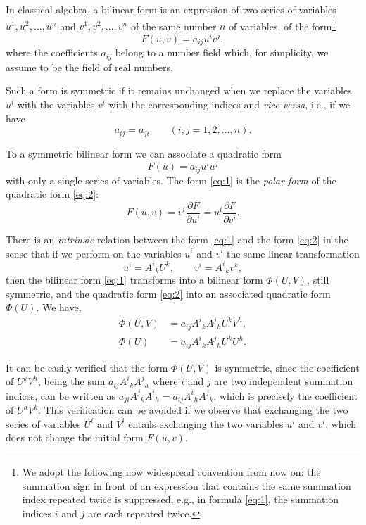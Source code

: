 \documentclass[leqno,11pt]{book}
\numberwithin{equation}{chapter}
\newcommand{\pd}{\partial}
\theoremstyle{shape1}
\theoremstyle{shape0}
\theoremstyle{shape2}
\theoremstyle{definition}
\begin{document}
\fsec In classical algebra,  a bilinear form  is an expression of two series of variables $u^{1}, u^{2}, \dots, u^{n}$ and $v^{1}, v^{2}, \dots, v^{n}$ of the same number $n$ of variables, of the form\footnote{We adopt the following now widespread convention from now on:  the summation sign in front of an expression that contains the same summation index repeated twice is suppressed, {e.g.}, in formula \eqref{eq:1},  the summation indices $i$ and $j$ are each repeated twice.}
\begin{equation}
  \label{eq:1}  
F(u,v)=a_{ij}u^{i}v^{j},
\end{equation}
where the coefficients $a_{ij}$ belong to a number field which, for simplicity, we assume to be the field of real numbers.

Such a form is  symmetric  if it remains unchanged when we replace the variables $u^{i}$ with the variables $v^{i}$ with the corresponding indices and \emph{vice versa}, {i.e.}, if we have
\[
a_{ij}=a_{ji}\qquad(i,j=1,2,\dots,n).
\]

To a symmetric bilinear form we can associate a quadratic form 
\begin{equation}
  \label{eq:2}
  F(u)=a_{ij}u^{i}u^{j}
\end{equation}
with only a single series of variables. The form \eqref{eq:1} is the \emph{polar form}  of the quadratic form \eqref{eq:2}:
\[
F(u,v)=v^{i}\frac{\pd F}{\pd u^{i}}=u^{i}\frac{\pd F}{\pd v^{i}}.
\]

There is an \emph{intrinsic} relation between the form \eqref{eq:1} and the form \eqref{eq:2} in the sense that if we perform on the variables $u^{i}$ and $v^{i}$ the same linear transformation
\[
u^{i}=A^{i}{}_{k}U^{k},\qquad v^{i}=A^{i}{}_{k}v^{k},
\] 
then the bilinear form \eqref{eq:1} transforms into a bilinear form $\Phi(U,V)$, still symmetric, and the quadratic form \eqref{eq:2} into an associated quadratic form $\Phi(U)$. We have,
\begin{align*}
\Phi(U,V)&=a_{ij}A^{i}{}_{k}A^{j}{}_{h}U^{k}V^{h},\\
\Phi(U)&=a_{ij}A^{i}{}_{k}A^{j}{}_{h}U^{k}U^{h}.
\end{align*}

It can be easily verified  that the form $\Phi(U,V)$ is symmetric, since the coefficient of $U^{k}V^{h}$, being the sum $a_{ij}A^{i}{}_{k}A^{j}{}_{h}$ where $i$ and $j$ are two independent summation indices, can be written as $a_{ji}A^{j}{}_{k}A^{i}{}_{h}=a_{ij}A^{i}{}_{h}A^{j}{}_{k}$, which is precisely the coefficient of $U^{h}V^{k}$. This verification can be avoided if we observe that exchanging the two series of variables $U^{i}$ and $V^{i}$ entails exchanging the two variables $u^{i}$ and $v^{i}$, which does not change the initial form $F(u,v)$.
\end{document}
